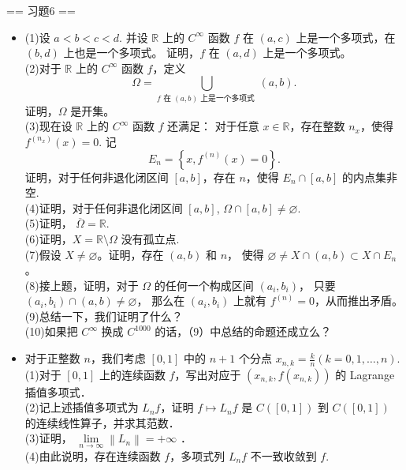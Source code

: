 == 习题6 ==
\begin{itemize}
	\item[1]
		(1)设 $a<b<c<d$. 并设 $\mathbb{R}$ 上的 $C^{\infty}$ 函数 $f$ 在 $(a, c)$ 上是一个多项式，在 $(b, d)$ 上也是一个多项式。
		证明，$f$ 在 $(a, d)$ 上是一个多项式。\\
		(2)对于 $\mathbb{R}$ 上的 $C^{\infty}$ 函数 $f$，定义
		$$\Omega=\bigcup_{f \text { 在 }(a, b) \text { 上是一个多项式 }}(a, b).$$
		证明，$\Omega$ 是开集。\\
		(3)现在设 $\mathbb{R}$ 上的 $C^{\infty}$ 函数 $f$ 还满足：
		对于任意 $x \in \mathbb{R}$，存在整数 $n_{x}$，使得 $f^{(n_{x})}(x)=0$. 记
		$$E_{n}=\left\{x, f^{(n)}(x)=0\right\}.$$
		证明，对于任何非退化闭区间 $[a, b]$，存在 $n$，使得 $E_{n} \cap[a, b]$ 的内点集非空.\\
		(4)证明，对于任何非退化闭区间 $[a, b]$, $\Omega \cap[a, b] \neq \varnothing$.\\
		(5)证明， $\overline{\Omega}=\mathbb{R}$.\\
		(6)证明，$X=\mathbb{R} \setminus \Omega$ 没有孤立点.\\
		(7)假设 $X \neq \varnothing$。证明，存在 $(a, b)$ 和 $n$，
		使得 $\varnothing \neq X \cap(a, b) \subset X \cap E_{n}$。\\
		(8)接上题，证明，对于 $\Omega$ 的任何一个构成区间 $\left(a_{i}, b_{i}\right)$，
		只要 $\left(a_{i}, b_{i}\right) \cap(a, b) \neq \varnothing$，
		那么在 $\left(a_{i}, b_{i}\right)$ 上就有 $f^{(n)}=0$，从而推出矛盾。\\
		(9)总结一下，我们证明了什么？\\
		(10)如果把 $C^{\infty}$ 换成 $C^{1000}$ 的话，（9）中总结的命题还成立么？\\
	\item[2]对于正整数 $n$，我们考虑 $[0,1]$ 中的 $n+1$ 个分点 $x_{n, k}=\displaystyle \frac{k}{n}(k=0,1, \ldots, n)$.\\
		(1)对于 $[0,1]$ 上的连续函数 $f$，写出对应于 $\left(x_{n, k}, f(x_{n, k})\right)$ 的 Lagrange 插值多项式．\\
		(2)记上述插值多项式为 $L_{n} f$，证明 $f \mapsto L_{n} f$ 是 $C([0,1])$ 到 $C([0,1])$ 的连续线性算子，并求其范数．\\
		(3)证明， $\lim \limits_{n \rightarrow \infty}\left\|L_{n}\right\|=+\infty$ ．\\
		(4)由此说明，存在连续函数 $f$，多项式列 $L_{n} f$ 不一致收敛到 $f$.
\end{itemize}

